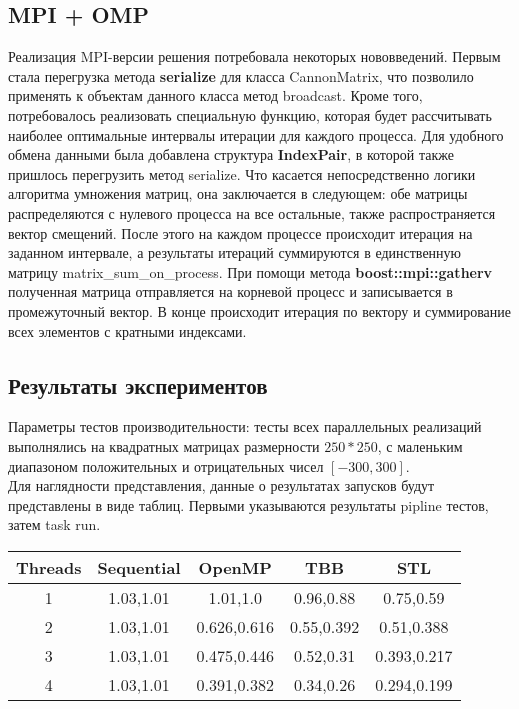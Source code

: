 \documentclass[20pt]{article}
\begin{document}
\subsection{MPI + OMP}
Реализация MPI-версии решения потребовала некоторых нововведений. Первым стала перегрузка метода \textbf{serialize} для класса CannonMatrix, что позволило применять к объектам данного класса метод broadcast. Кроме того, потребовалось реализовать специальную функцию, которая будет рассчитывать наиболее оптимальные интервалы итерации для каждого процесса. Для удобного обмена данными была добавлена структура \textbf{IndexPair}, в которой также пришлось перегрузить метод serialize. Что касается непосредственно логики алгоритма умножения матриц, она заключается в следующем: обе матрицы распределяются с нулевого процесса на все остальные, также распространяется вектор смещений. После этого на каждом процессе происходит итерация на заданном интервале, а результаты итераций суммируются в единственную матрицу matrix\_sum\_on\_process. При помощи метода \textbf{boost::mpi::gatherv} полученная матрица отправляется на корневой процесс и записывается в промежуточный вектор. В конце происходит итерация по вектору и суммирование всех элементов с кратными индексами. 
\newpage
\newpage
\begin{center}
    \section{Результаты экспериментов}
\end{center}

Параметры тестов производительности: тесты всех параллельных реализаций выполнялись на квадратных матрицах размерности $250*250$, с маленьким диапазоном положительных и отрицательных чисел $[-300, 300]$. \\

Для наглядности представления, данные о результатах запусков будут представлены в виде таблиц. Первыми указываются результаты pipline тестов, затем task run.
\\
\begin{center}
    \begin{tabular}{|c|c|c|c|c|}
    \cline{1-5}
     Threads & Sequential & OpenMP & TBB & STL\\  \hline
      1 & 1.03,1.01 & 1.01,1.0 & 0.96,0.88 & 0.75,0.59 \\ \hline
      2 & 1.03,1.01 & 0.626,0.616 & 0.55,0.392 & 0.51,0.388\\ \hline
      3 & 1.03,1.01 & 0.475,0.446 & 0.52,0.31 & 0.393,0.217 \\ \hline
      4 & 1.03,1.01 & 0.391,0.382 & 0.34,0.26 & 0.294,0.199\\ \hline
    \cline{1-5}
    \end{tabular}
\end{center} 
\end{document}
